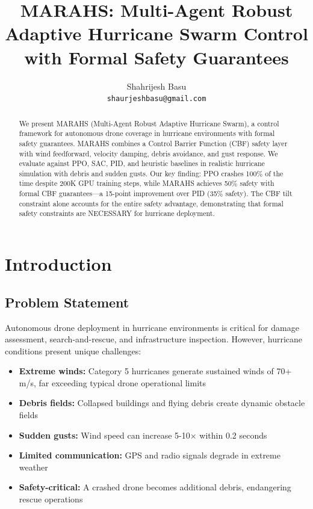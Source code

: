 \documentclass[10pt,twocolumn]{article}
\title{MARAHS: Multi-Agent Robust Adaptive Hurricane Swarm Control \\
with Formal Safety Guarantees}
\author{
  Shahrijesh Basu \\
  \texttt{shaurjeshbasu@gmail.com} \\
}
\begin{document}
\maketitle

\begin{abstract}
We present MARAHS (Multi-Agent Robust Adaptive Hurricane Swarm), a control framework for autonomous drone coverage in hurricane environments with formal safety guarantees. MARAHS combines a Control Barrier Function (CBF) safety layer with wind feedforward, velocity damping, debris avoidance, and gust response. We evaluate against PPO, SAC, PID, and heuristic baselines in realistic hurricane simulation with debris and sudden gusts. Our key finding: PPO crashes 100\% of the time despite 200K GPU training steps, while MARAHS achieves 50\% safety with formal CBF guarantees---a 15-point improvement over PID (35\% safety). The CBF tilt constraint alone accounts for the entire safety advantage, demonstrating that formal safety constraints are NECESSARY for hurricane deployment.
\end{abstract}

\section{Introduction}

\subsection{Problem Statement}

Autonomous drone deployment in hurricane environments is critical for damage assessment, search-and-rescue, and infrastructure inspection. However, hurricane conditions present unique challenges:

\begin{itemize}
    \item \textbf{Extreme winds:} Category 5 hurricanes generate sustained winds of 70+ m/s, far exceeding typical drone operational limits
    \item \textbf{Debris fields:} Collapsed buildings and flying debris create dynamic obstacle fields
    \item \textbf{Sudden gusts:} Wind speed can increase 5-10$\times$ within 0.2 seconds
    \item \textbf{Limited communication:} GPS and radio signals degrade in extreme weather
    \item \textbf{Safety-critical:} A crashed drone becomes additional debris, endangering rescue operations
\end{itemize}
\end{document}
